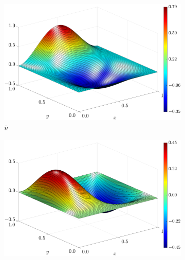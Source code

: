 \begin{figure}[H]
        \centering
        \caption{Soluções manufaturadas no regime de estado estacionário para o campo de velocidades $(\overline{u},\tilde{v})$, vorticidade $(\tilde{\omega_{z}})$ e função de corrente $(\tilde{\psi})$, considerando $\beta_{nn}=0.1$ e $a = 0.05$ em $t=0.1$}
        \label{U_m_u_sol_num_case1map2}
        \begin{subfigure}[b]{.47\textwidth}
            \includegraphics[width=\textwidth]{figures/Case12/UCM/Solutions/Exact_Surf_NormErr_2nd_Betann_0.1_Re_1_Wi_1_epsilon_0_xi_0_alphaG_0_Dt_1e-06_at_0.05_tipsim_1_MMS_12_U.eps}
            \caption{$\overline{u}$\label{fig_solexauCase1}}
        \end{subfigure}
        \vspace{0.2cm}
        \begin{subfigure}[b]{.47\textwidth}
            \includegraphics[width=\textwidth]{figures/Case12/UCM/Solutions/Exact_Surf_NormErr_2nd_Betann_0.1_Re_1_Wi_1_epsilon_0_xi_0_alphaG_0_Dt_1e-06_at_0.05_tipsim_1_MMS_12_V.eps}

\end{subfigure}
\end{figure}
